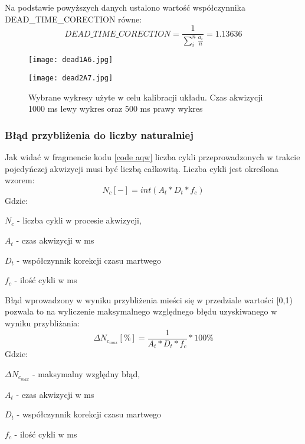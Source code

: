 Na podstawie powyższych danych ustalono wartość współczynnika DEAD\_TIME\_CORECTION równe:
\begin{equation}
        \label{dead time eq}
        DEAD\_TIME\_CORECTION = \frac{1}{\sum^n_i \frac{a_i}{n}} = 1.13636
\end{equation} 

\begin{figure}
        \centering
        \begin{multicols}{2}
                \texttt{[image: dead1A6.jpg]} \par
                \texttt{[image: dead2A7.jpg]} \par
        \end{multicols}
        \caption{Wybrane wykresy użyte w celu kalibracji układu. Czas akwizycji 1000 ms lewy wykres oraz 500 ms prawy wykres}
        \label{wykresy fit calib}
\end{figure}

\subsubsection{Błąd przybliżenia do liczby naturalniej}
Jak widać w fragmencie kodu \ref{code aqw} liczba cykli przeprowadzonych w trakcie pojedyńczej akwizycji musi być liczbą całkowitą. Liczba cykli jest określona wzorem:
\begin{equation}
        N_c [-] = int(A_t*D_t*f_c)
\end{equation}
Gdzie:
\begin{description}
        \item $N_c$ - liczba cykli w procesie akwizycji,
        \item $A_t$ - czas  akwizycji w ms
        \item $D_t$ - współczynnik korekcji czasu martwego 
        \item $f_c$ - ilość cykli w ms
\end{description}

Błąd wprowadzony w wyniku przybliżenia mieści się w przedziale wartości [0,1) pozwala to na wyliczenie maksymalnego względnego błędu uzyskiwanego w wyniku przybliżania:
\begin{equation}
        \Delta N_{c_{max}} [\%] = \frac{1}{A_t*D_t*f_c}  * 100\%
\end{equation} 
Gdzie:
\begin{description}
        \item $\Delta N_{c_{max}}$ - maksymalny względny błąd,
        \item $A_t$ - czas  akwizycji w ms
        \item $D_t$ - współczynnik korekcji czasu martwego 
        \item $f_c$ - ilość cykli w ms
\end{description}


